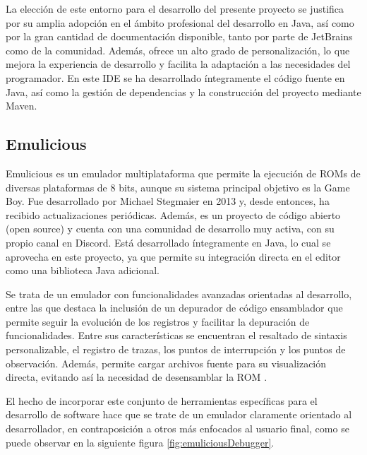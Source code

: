 \documentclass[../../main.tex]{subfiles}
\begin{document}
\par{La elección de este entorno para el desarrollo del presente proyecto se justifica por su amplia adopción en el ámbito profesional del desarrollo en Java, así como por la gran cantidad de documentación disponible, tanto por parte de JetBrains como de la comunidad. Además, ofrece un alto grado de personalización, lo que mejora la experiencia de desarrollo y facilita la adaptación a las necesidades del programador. En este IDE se ha desarrollado íntegramente el código fuente en Java, así como la gestión de dependencias y la construcción del proyecto mediante Maven.}

\clearpage

\subsection{Emulicious}

\par{Emulicious es un emulador multiplataforma que permite la ejecución de ROMs de diversas plataformas de 8 bits, aunque su sistema principal objetivo es la Game Boy. Fue desarrollado por Michael Stegmaier en 2013 y, desde entonces, ha recibido actualizaciones periódicas. Además, es un proyecto de código abierto (open source) y cuenta con una comunidad de desarrollo muy activa, con su propio canal en Discord. Está desarrollado íntegramente en Java, lo cual se aprovecha en este proyecto, ya que permite su integración directa en el editor como una biblioteca Java adicional.}

\par{Se trata de un emulador con funcionalidades avanzadas orientadas al desarrollo, entre las que destaca la inclusión de un depurador de código ensamblador que permite seguir la evolución de los registros y facilitar la depuración de funcionalidades. Entre sus características se encuentran el resaltado de sintaxis personalizable, el registro de trazas, los puntos de interrupción y los puntos de observación. Además, permite cargar archivos fuente para su visualización directa, evitando así la necesidad de desensamblar la ROM \cite{emulicious_net}.}

\par{El hecho de incorporar este conjunto de herramientas específicas para el desarrollo de software hace que se trate de un emulador claramente orientado al desarrollador, en contraposición a otros más enfocados al usuario final, como se puede observar en la siguiente figura \ref{fig:emuliciousDebugger}.}
\end{document}
